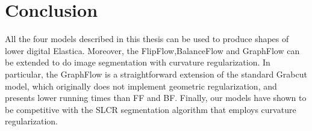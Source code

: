 


\section{Conclusion}

All the four models described in this thesis can be used to produce shapes of lower digital Elastica. Moreover, the FlipFlow,BalanceFlow and GraphFlow can be extended to do image segmentation with curvature regularization. In particular, the GraphFlow is a straightforward extension of the standard Grabcut model, which originally does not implement geometric regularization, and presents lower running times than FF and BF. Finally, our models have shown to be competitive with the SLCR segmentation algorithm that employs curvature regularization.




